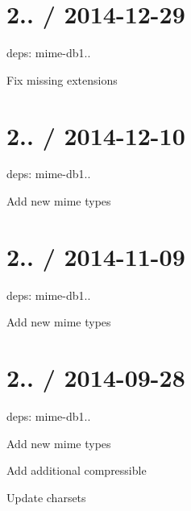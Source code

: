 \section*{2.. / 2014-\/12-\/29 }


\begin{DoxyItemize}
\item deps\+: mime-\/db1..
\begin{DoxyItemize}
\item Fix missing extensions
\end{DoxyItemize}
\end{DoxyItemize}

\section*{2.. / 2014-\/12-\/10 }


\begin{DoxyItemize}
\item deps\+: mime-\/db1..
\begin{DoxyItemize}
\item Add new mime types
\end{DoxyItemize}
\end{DoxyItemize}

\section*{2.. / 2014-\/11-\/09 }


\begin{DoxyItemize}
\item deps\+: mime-\/db1..
\begin{DoxyItemize}
\item Add new mime types
\end{DoxyItemize}
\end{DoxyItemize}

\section*{2.. / 2014-\/09-\/28 }


\begin{DoxyItemize}
\item deps\+: mime-\/db1..
\begin{DoxyItemize}
\item Add new mime types
\item Add additional compressible
\item Update charsets
\end{DoxyItemize}
\end{DoxyItemize}

